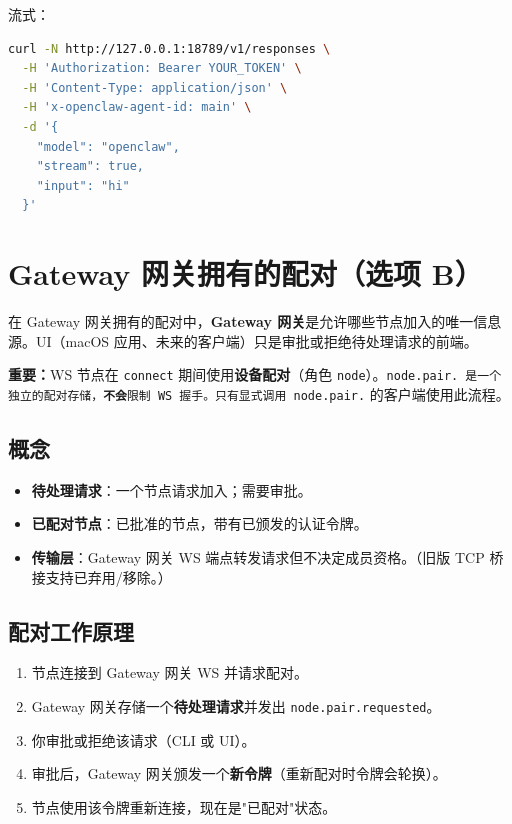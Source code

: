 流式：

\begin{lstlisting}[language=bash]
curl -N http://127.0.0.1:18789/v1/responses \
  -H 'Authorization: Bearer YOUR_TOKEN' \
  -H 'Content-Type: application/json' \
  -H 'x-openclaw-agent-id: main' \
  -d '{
    "model": "openclaw",
    "stream": true,
    "input": "hi"
  }'
\end{lstlisting}



\clearpage

\section{Gateway 网关拥有的配对（选项 B）}


在 Gateway 网关拥有的配对中，\textbf{Gateway 网关}是允许哪些节点加入的唯一信息源。UI（macOS 应用、未来的客户端）只是审批或拒绝待处理请求的前端。

\textbf{重要：}WS 节点在 \texttt{connect} 期间使用\textbf{设备配对}（角色 \texttt{node}）。\texttt{node.pair.\textit{} 是一个独立的配对存储，\textbf{不会}限制 WS 握手。只有显式调用 \texttt{node.pair.}} 的客户端使用此流程。

\subsection{概念}


\begin{itemize}
  \item \textbf{待处理请求}：一个节点请求加入；需要审批。
  \item \textbf{已配对节点}：已批准的节点，带有已颁发的认证令牌。
  \item \textbf{传输层}：Gateway 网关 WS 端点转发请求但不决定成员资格。（旧版 TCP 桥接支持已弃用/移除。）
\end{itemize}


\subsection{配对工作原理}


\begin{enumerate}
  \item 节点连接到 Gateway 网关 WS 并请求配对。
  \item Gateway 网关存储一个\textbf{待处理请求}并发出 \texttt{node.pair.requested}。
  \item 你审批或拒绝该请求（CLI 或 UI）。
  \item 审批后，Gateway 网关颁发一个\textbf{新令牌}（重新配对时令牌会轮换）。
  \item 节点使用该令牌重新连接，现在是"已配对"状态。
\end{enumerate}


